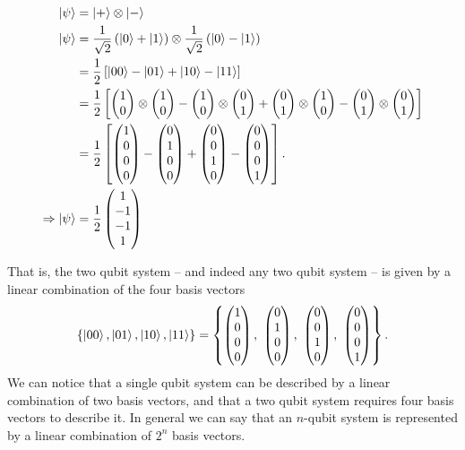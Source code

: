 \begin{equation}
    \begin{split}
    \ket{\psi} &= |+\rangle \otimes |-\rangle 
    \\ \ket{\psi} &=  \frac{1}{\sqrt{2}} \left( \ket{0} + \ket{1} \right) \otimes  \frac{1}{\sqrt{2}} \left( \ket{0} - \ket{1} \right)
    \\ &= \frac{1}{2} \left[ \ket{00} - \ket{01} + \ket{10} - \ket{11} \right] 
    \\ &= \frac{1}{2} \left[ \left(\begin{matrix}1\\0\end{matrix}\right) \otimes \left(\begin{matrix}1\\0\end{matrix}\right) - \left(\begin{matrix}1\\0\end{matrix}\right) \otimes \left(\begin{matrix}0\\1\end{matrix}\right) + \left(\begin{matrix}0\\1\end{matrix}\right) \otimes \left(\begin{matrix}1\\0\end{matrix}\right) - \left(\begin{matrix}0\\1\end{matrix}\right) \otimes \left(\begin{matrix}0\\1\end{matrix}\right) \right]
    \\ &= \frac{1}{2} \left[ \left(\begin{matrix}1\\0\\0\\0\end{matrix}\right) - \left(\begin{matrix}0\\1\\0\\0\end{matrix}\right) + \left(\begin{matrix}0\\0\\1\\0\end{matrix}\right) - \left(\begin{matrix}0\\0\\0\\1\end{matrix}\right) \right].
    \\ \Rightarrow \ket{\psi} &= \frac{1}{2} \left(\begin{matrix}1\\-1\\-1\\1\end{matrix}\right) 
    \end{split}
\end{equation}

That is, the two qubit system -- and indeed any two qubit system -- is given by a linear combination of the four basis vectors
\begin{equation}
    \left\{ \ket{00}, \ket{01}, \ket{10}, \ket{11} \right\} 
    = \left\{ \icol{1\\0\\0\\0}, \ \icol{0\\1\\0\\0}, \ \icol{0\\0\\1\\0}, \  \icol{0\\0\\0\\1} \right\}.
\end{equation}
We can notice that a single qubit system can be described by a linear combination of two basis vectors, 
    and that a two qubit system requires four basis vectors to describe it. 
In general we can say that an $n$-qubit system is represented by a linear combination of $2^n$ basis vectors. 

